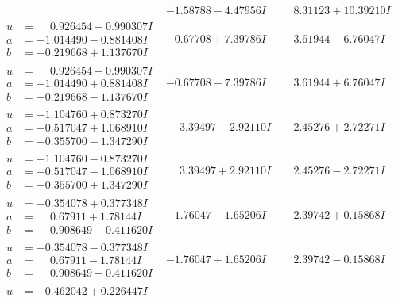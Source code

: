\documentclass[1p]{elsarticle_modified}
\theoremstyle{definition}
\begin{document}
$$\begin{array}{c|c|c}
 & -1.58788 - 4.47956 I & \phantom{-}8.31123 + 10.39210 I \\ \hline\begin{aligned}
u &= \phantom{-}0.926454 + 0.990307 I \\
a &= -1.014490 - 0.881408 I \\
b &= -0.219668 + 1.137670 I\end{aligned}
 & -0.67708 + 7.39786 I & \phantom{-}3.61944 - 6.76047 I \\ \hline\begin{aligned}
u &= \phantom{-}0.926454 - 0.990307 I \\
a &= -1.014490 + 0.881408 I \\
b &= -0.219668 - 1.137670 I\end{aligned}
 & -0.67708 - 7.39786 I & \phantom{-}3.61944 + 6.76047 I \\ \hline\begin{aligned}
u &= -1.104760 + 0.873270 I \\
a &= -0.517047 + 1.068910 I \\
b &= -0.355700 - 1.347290 I\end{aligned}
 & \phantom{-}3.39497 - 2.92110 I & \phantom{-}2.45276 + 2.72271 I \\ \hline\begin{aligned}
u &= -1.104760 - 0.873270 I \\
a &= -0.517047 - 1.068910 I \\
b &= -0.355700 + 1.347290 I\end{aligned}
 & \phantom{-}3.39497 + 2.92110 I & \phantom{-}2.45276 - 2.72271 I \\ \hline\begin{aligned}
u &= -0.354078 + 0.377348 I \\
a &= \phantom{-}0.67911 + 1.78144 I \\
b &= \phantom{-}0.908649 - 0.411620 I\end{aligned}
 & -1.76047 - 1.65206 I & \phantom{-}2.39742 + 0.15868 I \\ \hline\begin{aligned}
u &= -0.354078 - 0.377348 I \\
a &= \phantom{-}0.67911 - 1.78144 I \\
b &= \phantom{-}0.908649 + 0.411620 I\end{aligned}
 & -1.76047 + 1.65206 I & \phantom{-}2.39742 - 0.15868 I \\ \hline\begin{aligned}
u &= -0.462042 + 0.226447 I \\

\end{aligned}
\end{array}$$
\end{document}
